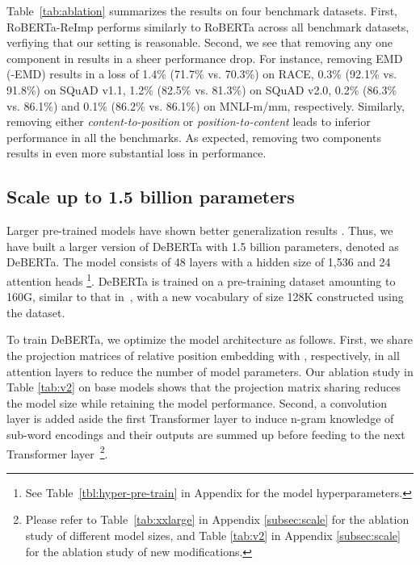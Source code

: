 Table~\ref{tab:ablation} summarizes the results on four benchmark datasets. 
First, RoBERTa-ReImp performs similarly to RoBERTa across all  benchmark datasets, verfiying that our setting is reasonable. 
Second, we see that removing any one component in {\ModelName} results in a sheer performance drop. 
For instance, removing EMD (-EMD) results in a loss of 1.4\% (71.7\% vs. 70.3\%) on RACE, 0.3\% (92.1\% vs. 91.8\%) on SQuAD v1.1, 1.2\% (82.5\% vs. 81.3\%) on SQuAD v2.0, 0.2\% (86.3\% vs. 86.1\%) and 0.1\% (86.2\% vs. 86.1\%) on MNLI-m/mm, respectively. 
Similarly, removing either \textit{content-to-position} or  \textit{position-to-content} leads to inferior performance in all the benchmarks.
As expected, removing two components results in even more substantial loss in performance. 










































\subsection{Scale up to 1.5 billion parameters}
Larger pre-trained models have shown better generalization results \citep{raffel2019t5,brown2020language, shoeybi2019megatron}. 
Thus, we have built a larger version of DeBERTa with 1.5 billion parameters, denoted as DeBERTa.
The model consists of 48 layers with a hidden size of 1,536 and 24 attention heads
\footnote{See Table~\ref{tbl:hyper-pre-train} in Appendix for the model hyperparameters.}.
DeBERTa is trained on a pre-training dataset amounting to 160G, similar to that in~\cite{liu2019roberta}, with a new vocabulary of size 128K constructed using the dataset.


To train DeBERTa, we optimize the model architecture as follows. 
First, we share the projection matrices of relative position embedding  with , respectively, in all attention layers to reduce the number of model parameters. Our ablation study in Table \ref{tab:v2} on base models shows that the projection matrix sharing reduces the model size while retaining the model performance.
Second, a convolution layer is added aside the first Transformer layer to induce n-gram knowledge of sub-word encodings and their outputs are summed up before feeding to the next Transformer layer~\footnote{Please refer to Table~\ref{tab:xxlarge} in Appendix \ref{subsec:scale} for the ablation study of different model sizes, and Table \ref{tab:v2} in Appendix \ref{subsec:scale} for the ablation study of new modifications.}.



